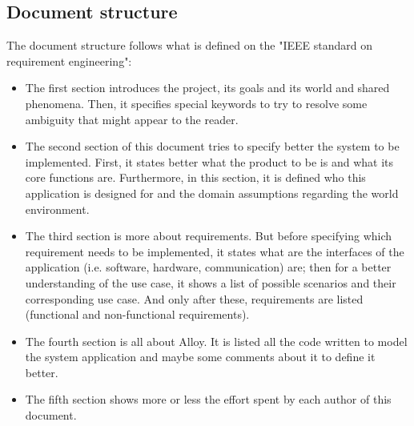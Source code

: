 \subsection{Document structure}
The document structure follows what is defined on the "IEEE standard on requirement engineering":
\begin{itemize}
\item The first section introduces the project, its goals and its world and shared phenomena. Then, it specifies special keywords to try to resolve some ambiguity that might appear to the reader.
\item The second section of this document tries to specify better the system to be implemented. First, it states better what the product to be is and what its core functions are. Furthermore, in this section, it is defined who this application is designed for and the domain assumptions regarding the world environment.
\item The third section is more about requirements. But before specifying which requirement needs to be implemented, it states what are the interfaces of the application (i.e. software, hardware, communication) are; then for a better understanding of the use case, it shows a list of possible scenarios and their corresponding use case. And only after these, requirements are listed (functional and non-functional requirements).
\item The fourth section is all about Alloy. It is listed all the code written to model the system application and maybe some comments about it to define it better.
\item The fifth section shows more or less the effort spent by each author of this document.
\end{itemize}